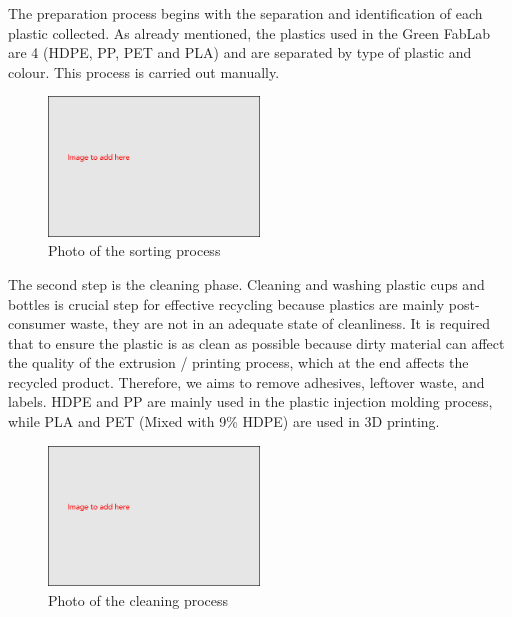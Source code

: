 \documentclass[
  11pt,
]{article}
\begin{document}
The preparation process begins with the separation and identification of
each plastic collected. As already mentioned, the plastics used in the
Green FabLab are 4 (HDPE, PP, PET and PLA) and are separated by type of
plastic and colour. This process is carried out manually.

\begin{figure}[H]

{\centering \includegraphics[width=0.5\textwidth,height=\textheight]{figures/Image-to-add.png}

}

\caption{Photo of the sorting process}

\end{figure}

The second step is the cleaning phase. Cleaning and washing plastic cups
and bottles is crucial step for effective recycling because plastics are
mainly post-consumer waste, they are not in an adequate state of
cleanliness. It is required that to ensure the plastic is as clean as
possible because dirty material can affect the quality of the extrusion
/ printing process, which at the end affects the recycled product.
Therefore, we aims to remove adhesives, leftover waste, and labels. HDPE
and PP are mainly used in the plastic injection molding process, while
PLA and PET (Mixed with 9\% HDPE) are used in 3D printing.

\begin{figure}[H]

{\centering \includegraphics[width=0.5\textwidth,height=\textheight]{figures/Image-to-add.png}

}

\caption{Photo of the cleaning process}

\end{figure}
\end{document}
